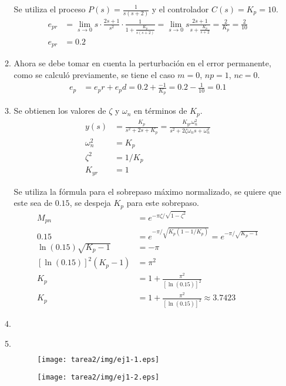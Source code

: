 \begin{ejercicio}
\begin{enumerate}
\begin{enumerate}
      Se utiliza el proceso $P(s)=\frac{1}{s(s+2)}$ y el controlador $C(s)=K_p=10$.
      \begin{align*}
        e_{pr} &= \lim_{s\rightarrow 0} s \cdot \frac{2s+1}{s^2} \cdot \frac{1}{1+\frac{K_p}{s(s+2)}}
        =
        \lim_{s\rightarrow 0} s\frac{2s+1}{s+\frac{K_p}{s+2}}
        = \frac{2}{K_p} = \frac{2}{10}
        \\
        e_{pr} &= 0.2
      \end{align*}

      \item %
      Ahora se debe tomar en cuenta la perturbación en el error permanente, como se calculó previamente, se tiene el caso $m=0$, $np=1$, $nc=0$.
      \begin{align*}
        e_p &= e_pr + e_pd = 0.2 + \frac{-1}{K_p} = 0.2 - \frac{1}{10} = 0.1
      \end{align*}

      \item %
      Se obtienen los valores de $\zeta$ y $\omega_n$ en términos de $K_p$.
      \begin{align*}
        y(s) &= \frac{K_p}{s^2+2s+K_p} = \frac{K_{yr}\omega_n^2}{s^2+ 2\zeta \omega_n s + \omega_n^2}
        \\
        \omega_n^2 &= K_p
        \\
        \zeta^2 &= 1/K_p
        \\
        K_{yr} &= 1
      \end{align*}

      Se utiliza la fórmula para el sobrepaso máximo normalizado, se quiere que este sea de $0.15$, se despeja $K_p$ para este sobrepaso.
      \begin{align*}
        M_{pn} &= e^{-\pi\zeta/\sqrt{1-\zeta^2}}
        \\
        0.15 &= e^{-\pi/\sqrt{K_p(1-1/K_p)}} = e^{-\pi/\sqrt{K_p-1}}
        \\
        \ln(0.15)\sqrt{K_p-1} &= -\pi
        \\
        [\ln(0.15)]^2 (K_p-1) &= \pi^2
        \\
        K_p &= 1 + \frac{\pi^2}{[\ln(0.15)]^2}
        \\
        K_p &= 1 + \frac{\pi^2}{[\ln(0.15)]^2} \approx 3.7423
      \end{align*}

      \item %
      \item %
      $\quad$
      \begin{figure}[H]
        \centering
        \texttt{[image: tarea2/img/ej1-1.eps]}
      \end{figure}
      \begin{figure}[H]
        \centering
        \texttt{[image: tarea2/img/ej1-2.eps]}
      \end{figure}
    \end{enumerate}
  \end{enumerate}

\end{ejercicio}